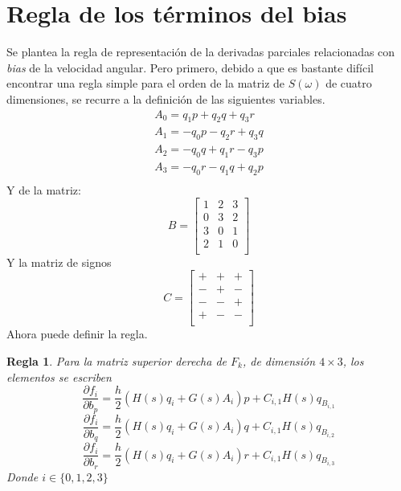 \documentclass[10pt]{report}
\numberwithin{equation}{chapter}
\numberwithin{algorithm}{chapter}
\newtheorem{regla}{Regla}[section]
\newcommand{\parderiv}[2]{\frac{\partial #1}{\partial #2}}
\begin{document}
\section{Regla de los términos del bias}
Se plantea la regla de representación de la derivadas parciales relacionadas con \emph{bias} de la velocidad angular. Pero primero, debido a que es bastante difícil encontrar una regla simple para el orden de la matriz de $S(\omega)$ de cuatro dimensiones, se recurre a la definición de las siguientes variables.
\begin{gather*}
A_0=q_1p+q_2q+q_3r\\
A_1=-q_0p-q_2r+q_3q\\
A_2=-q_0q+q_1r-q_3p\\
A_3=-q_0r-q_1q+q_2p\\
\end{gather*}
Y de la matriz:
\begin{equation*}
B=
\begin{bmatrix}
1&2&3\\
0&3&2\\
3&0&1\\
2&1&0\\
\end{bmatrix}
\end{equation*}
Y la matriz de signos
\begin{equation*}
C=
\begin{bmatrix}
+&+&+\\
-&+&-\\
-&-&+\\
+&-&-\\
\end{bmatrix}
\end{equation*}
Ahora puede definir la regla.
\begin{regla}
Para la matriz superior derecha de $F_k$, de dimensión $4\times3$, los elementos se escriben
\begin{equation}
\parderiv{f_i}{b_p}=\frac{h}{2}\left( H(s)q_i+G(s)A_i\right)p+C_{i,1}H(s)q_{B_{i,1}}
\end{equation}
\begin{equation}
\parderiv{f_i}{b_q}=\frac{h}{2}\left( H(s)q_i+G(s)A_i\right)q+C_{i,1}H(s)q_{B_{i,2}}
\end{equation}
\begin{equation}
\parderiv{f_i}{b_r}=\frac{h}{2}\left( H(s)q_i+G(s)A_i\right)r+C_{i,1}H(s)q_{B_{i,3}}
\end{equation}
Donde $i\in\{0,1,2,3\}$
\end{regla}
\end{document}
